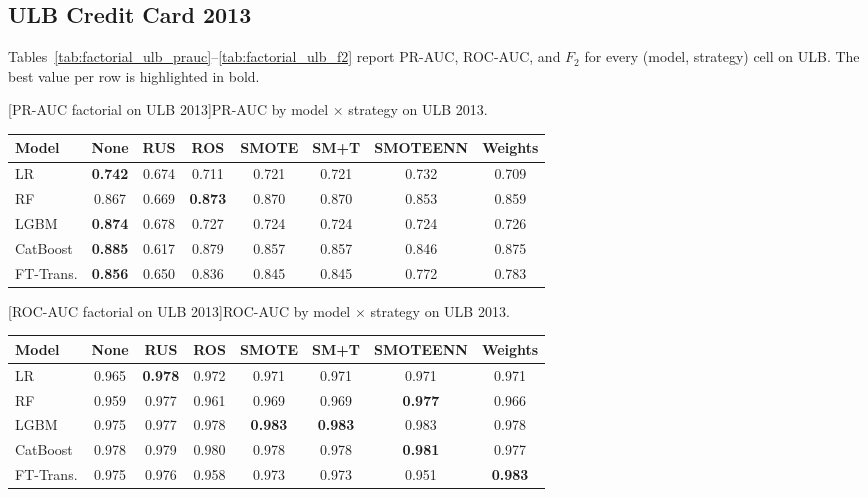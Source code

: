 
\subsection{ULB Credit Card 2013}

Tables~\ref{tab:factorial_ulb_prauc}--\ref{tab:factorial_ulb_f2} report PR-AUC, ROC-AUC, and $F_2$ for every (model, strategy) cell on ULB. The best value per row is highlighted in bold.

\noindent\begin{minipage}{\linewidth}\centering
{}[PR-AUC factorial on ULB 2013]{PR-AUC by model $\times$ strategy on ULB 2013.}
\label{tab:factorial_ulb_prauc}
\begin{tabular}{l c c c c c c c}
\toprule
Model & None & RUS & ROS & SMOTE & SM+T & SMOTEENN & Weights \\
\midrule
LR         & \textbf{0.742} & 0.674 & 0.711 & 0.721 & 0.721 & 0.732 & 0.709 \\
RF         & 0.867 & 0.669 & \textbf{0.873} & 0.870 & 0.870 & 0.853 & 0.859 \\
LGBM       & \textbf{0.874} & 0.678 & 0.727 & 0.724 & 0.724 & 0.724 & 0.726 \\
CatBoost   & \textbf{0.885} & 0.617 & 0.879 & 0.857 & 0.857 & 0.846 & 0.875 \\
FT-Trans.  & \textbf{0.856} & 0.650 & 0.836 & 0.845 & 0.845 & 0.772 & 0.783 \\
\bottomrule
\end{tabular}
\end{minipage}

\noindent\begin{minipage}{\linewidth}\centering
{}[ROC-AUC factorial on ULB 2013]{ROC-AUC by model $\times$ strategy on ULB 2013.}
\label{tab:factorial_ulb_rocauc}
\begin{tabular}{l c c c c c c c}
\toprule
Model & None & RUS & ROS & SMOTE & SM+T & SMOTEENN & Weights \\
\midrule
LR         & 0.965 & \textbf{0.978} & 0.972 & 0.971 & 0.971 & 0.971 & 0.971 \\
RF         & 0.959 & 0.977 & 0.961 & 0.969 & 0.969 & \textbf{0.977} & 0.966 \\
LGBM       & 0.975 & 0.977 & 0.978 & \textbf{0.983} & \textbf{0.983} & 0.983 & 0.978 \\
CatBoost   & 0.978 & 0.979 & 0.980 & 0.978 & 0.978 & \textbf{0.981} & 0.977 \\
FT-Trans.  & 0.975 & 0.976 & 0.958 & 0.973 & 0.973 & 0.951 & \textbf{0.983} \\
\bottomrule
\end{tabular}
\end{minipage}

